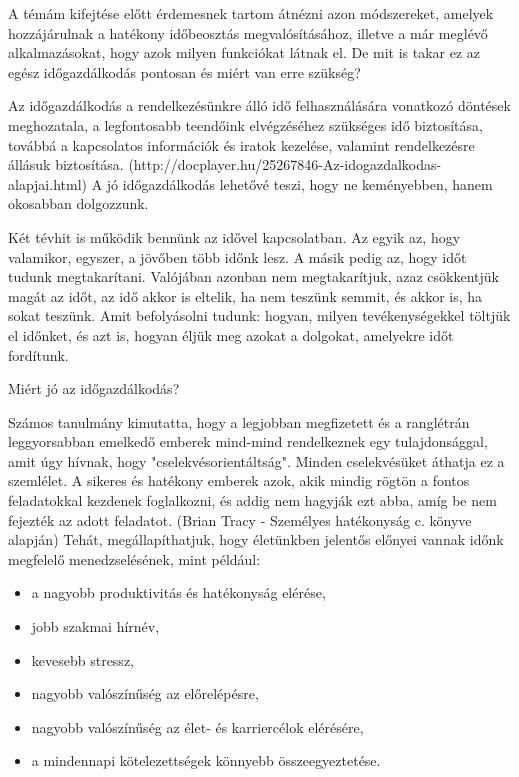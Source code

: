 
A témám kifejtése előtt érdemesnek tartom átnézni azon módszereket, amelyek hozzájárulnak a hatékony időbeosztás megvalósításához, illetve a már meglévő alkalmazásokat, hogy azok milyen funkciókat látnak el. De mit is takar ez az egész időgazdálkodás pontosan és miért van erre szükség?

Az időgazdálkodás a rendelkezésünkre álló idő felhasználására vonatkozó döntések meghozatala, a legfontosabb teendőink elvégzéséhez szükséges idő biztosítása, továbbá a kapcsolatos információk és iratok kezelése, valamint rendelkezésre állásuk biztosítása. (http://docplayer.hu/25267846-Az-idogazdalkodas-alapjai.html) A jó időgazdálkodás lehetővé teszi, hogy ne keményebben, hanem okosabban dolgozzunk.


Két tévhit is működik bennünk az idővel kapcsolatban. Az egyik az, hogy valamikor, egyszer, a jövőben több időnk lesz. A másik pedig az, hogy időt tudunk megtakarítani.  Valójában azonban nem megtakarítjuk, azaz csökkentjük magát az időt, az idő akkor is eltelik, ha nem teszünk semmit, és akkor is, ha sokat teszünk. Amit befolyásolni tudunk: hogyan, milyen tevékenységekkel töltjük el időnket, és azt is, hogyan éljük meg azokat a dolgokat, amelyekre időt fordítunk. 


Miért jó az időgazdálkodás?

Számos tanulmány kimutatta, hogy a legjobban megfizetett és a ranglétrán leggyorsabban emelkedő emberek mind-mind rendelkeznek egy tulajdonsággal, amit úgy hívnak, hogy "cselekvésorientáltság". Minden cselekvésüket áthatja ez a szemlélet. A sikeres és hatékony emberek azok, akik mindig rögtön a fontos feladatokkal kezdenek foglalkozni, és addig nem hagyják ezt abba, amíg be nem fejezték az adott feladatot. (Brian Tracy - Személyes hatékonyság c. könyve alapján)
Tehát, megállapíthatjuk, hogy életünkben jelentős előnyei vannak időnk megfelelő menedzselésének, mint például:
\begin{itemize}
\item a nagyobb produktivitás és hatékonyság elérése,
\item jobb szakmai hírnév,
\item kevesebb stressz,
\item nagyobb valószínűség az előrelépésre,
\item nagyobb valószínűség az élet- és karriercélok elérésére,
\item a mindennapi kötelezettségek könnyebb összeegyeztetése.
\end{itemize}

